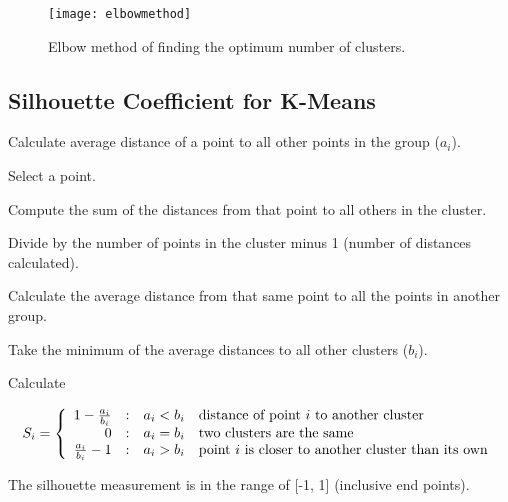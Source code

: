 	\begin{figure}[h]
		\centering
		\texttt{[image: elbowmethod]}
		\caption{Elbow method of finding the optimum number of clusters.}
		\label{fig:elbowmethod}
	\end{figure}

	\subsection{Silhouette Coefficient for K-Means}
	\begin{numberedlist}
		\item Calculate average distance of a point to all other points in the group ($a_i$).
			\begin{numberedlist}
				\item Select a point.
				\item Compute the sum of the distances from that point to all others in the cluster.
				\item Divide by the number of points in the cluster minus 1 (number of distances calculated).
			\end{numberedlist}
		\item Calculate the average distance from that same point to all the points in another group.
		\item Take the minimum of the average distances to all other clusters ($b_i$).
		\item Calculate
	\end{numberedlist}

	\begin{equation}
		S_i = \left\{ \begin{array}{r@{\quad : \quad}ll}
									1-\frac{a_i}{b_i}    &   a_i < b_i  & \text{distance of point $i$ to another cluster}    \\
                                            0            &   a_i = b_i  & \text{two clusters are the same}    \\
                                    \frac{a_i}{b_i}-1    &   a_i > b_i  & \text{point $i$ is closer to another cluster than its own}    \\
                      \end{array}\right.
	\end{equation}

The silhouette measurement is in the range of [-1, 1] (inclusive end points).

